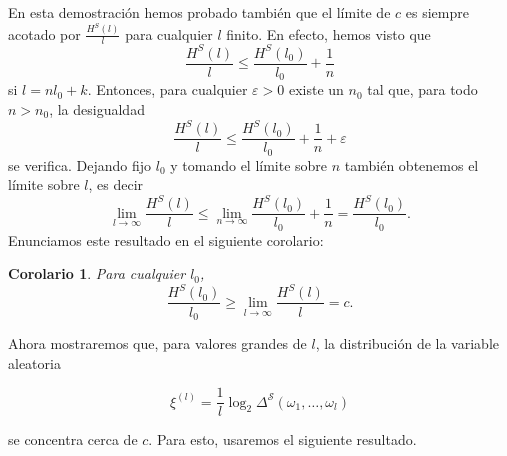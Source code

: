 \documentclass{report}
\newtheorem{cor}{Corolario}[thm]
\begin{document}
En esta demostración hemos probado también que el límite de $c$ es siempre acotado por $\frac{H^S(l)}{l}$ para cualquier $l$ finito.
En efecto, hemos visto que
\[
    \frac{H^S(l)}{l} \leq \frac{H^S(l_0)}{l_0} + \frac{1}{n}
\]
si $l=n l_0+k$. Entonces, para cualquier $\varepsilon>0$ existe un $n_0$ tal que, para todo $n>n_0$, la desigualdad
\[
    \frac{H^S(l)}{l} \leq \frac{H^S(l_0)}{l_0} + \frac{1}{n} + \varepsilon
\]
se verifica. Dejando fijo $l_0$ y tomando el límite sobre $n$ también obtenemos el límite sobre $l$, es decir
\[
    \lim_{l\to\infty} \frac{H^S(l)}{l} \leq \lim_{n\to\infty} \frac{H^S(l_0)}{l_0} + \frac{1}{n} = \frac{H^S(l_0)}{l_0}.
\]
Enunciamos este resultado en el siguiente corolario:

\begin{cor}\label{corolario de la cota del límite de la entropia}
    Para cualquier $l_0$,
    \[
        \frac{H^S(l_0)}{l_0} \geq \lim_{l\to\infty} \frac{H^S(l)}{l} = c.
    \]
\end{cor}

Ahora mostraremos que, para valores grandes de \( l \), la distribución de la variable aleatoria  

\[
\xi^{(l)} = \frac{1}{l} \log_2 \Delta^{\mathcal{S}}(\omega_1, \dots, \omega_l)
\]

se concentra cerca de \( c \). Para esto, usaremos el siguiente resultado.
\end{document}
